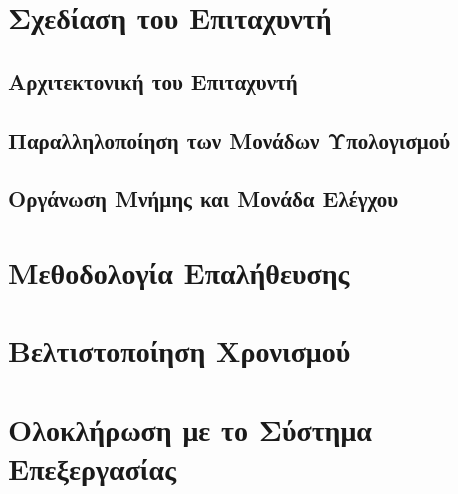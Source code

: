\section{Σχεδίαση του Επιταχυντή}

\subsection{Αρχιτεκτονική του Επιταχυντή}

\subsection{Παραλληλοποίηση των Μονάδων Υπολογισμού}

\subsection{Οργάνωση Μνήμης και Μονάδα Ελέγχου}

\section{Μεθοδολογία Επαλήθευσης}

\section{Βελτιστοποίηση Χρονισμού}

\section{Ολοκλήρωση με το Σύστημα Επεξεργασίας}

